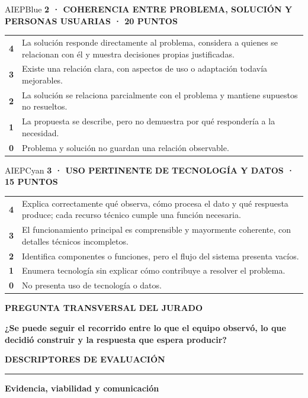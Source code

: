 \documentclass[10pt,a4paper]{article}
\newcommand{\kicker}[1]{%
  {\color{AIEPRed}\scriptsize\bfseries\MakeUppercase{#1}}\par\vspace{2.4mm}
  {\color{AIEPRed}\rule{13mm}{1.2pt}}\vspace{3mm}
}
\newcommand{\labeltext}[1]{%
  {\scriptsize\bfseries\color{AIEPSlate}\MakeUppercase{#1}}\par\vspace{1.2mm}
}
\begin{document}
\begin{softcard}{AIEPBlue}
\labeltext{2 · Coherencia entre problema, solución y personas usuarias · 20 puntos}
\begin{tabularx}{\textwidth}{@{}C{11mm}Y@{}}
\textbf{4} & La solución responde directamente al problema, considera a quienes se relacionan con él y muestra decisiones propias justificadas.\\
\textbf{3} & Existe una relación clara, con aspectos de uso o adaptación todavía mejorables.\\
\textbf{2} & La solución se relaciona parcialmente con el problema y mantiene supuestos no resueltos.\\
\textbf{1} & La propuesta se describe, pero no demuestra por qué respondería a la necesidad.\\
\textbf{0} & Problema y solución no guardan una relación observable.\\
\end{tabularx}
\end{softcard}

\begin{softcard}{AIEPCyan}
\labeltext{3 · Uso pertinente de tecnología y datos · 15 puntos}
\begin{tabularx}{\textwidth}{@{}C{11mm}Y@{}}
\textbf{4} & Explica correctamente qué observa, cómo procesa el dato y qué respuesta produce; cada recurso técnico cumple una función necesaria.\\
\textbf{3} & El funcionamiento principal es comprensible y mayormente coherente, con detalles técnicos incompletos.\\
\textbf{2} & Identifica componentes o funciones, pero el flujo del sistema presenta vacíos.\\
\textbf{1} & Enumera tecnología sin explicar cómo contribuye a resolver el problema.\\
\textbf{0} & No presenta uso de tecnología o datos.\\
\end{tabularx}
\end{softcard}

\begin{card}
\labeltext{Pregunta transversal del jurado}
{\large\bfseries\color{AIEPNavy}
¿Se puede seguir el recorrido entre lo que el equipo observó, lo que decidió construir y la
respuesta que espera producir?}
\end{card}

\newpage
\kicker{Descriptores de evaluación}
{\LARGE\bfseries\color{AIEPNavy} Evidencia, viabilidad y comunicación}\par
\vspace{4mm}
\end{document}
